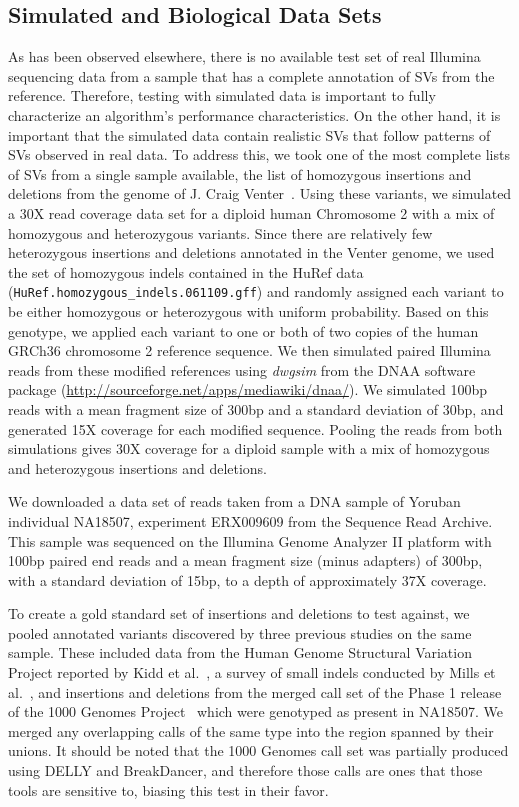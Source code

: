 \documentclass[11pt]{article}
\begin{document}
\subsection{Simulated and Biological Data Sets}\label{section_eval_data_sets}

As has been observed elsewhere, there is no available test set of real Illumina sequencing data from a sample that has a complete annotation of SVs from the reference. Therefore, testing with simulated data is important to fully characterize an algorithm's performance characteristics. On the other hand, it is important that the simulated data contain realistic SVs that follow patterns of SVs observed in real data. To address this, we took one of the most complete lists of SVs from a single sample available, the list of homozygous insertions and deletions from the genome of J. Craig Venter~\citep{Levy:2007fb}. Using these variants, we simulated a 30X read coverage data set for a diploid human Chromosome 2 with a mix of homozygous and heterozygous variants.  Since there are relatively few heterozygous insertions and deletions annotated in the Venter genome, we used the set of homozygous indels contained in the HuRef data (\texttt{HuRef.homozygous\_indels.061109.gff}) and randomly assigned each variant to be either homozygous or heterozygous with uniform probability. Based on this genotype, we applied each variant to one or both of two copies of the human GRCh36 chromosome 2 reference sequence. We then simulated paired Illumina reads from these modified references using \emph{dwgsim} from the DNAA software package (\url{http://sourceforge.net/apps/mediawiki/dnaa/}). We simulated 100bp reads with a mean fragment size of 300bp and a standard deviation of 30bp, and generated 15X coverage for each modified sequence. Pooling the reads from both simulations gives 30X coverage for a diploid sample with a mix of homozygous and heterozygous insertions and deletions.

We downloaded a data set of reads taken from a DNA sample of Yoruban individual NA18507, experiment ERX009609 from the Sequence Read Archive. This sample was sequenced on the Illumina Genome Analyzer II platform with 100bp paired end reads and a mean fragment size (minus adapters) of 300bp, with a standard deviation of 15bp, to a depth of approximately 37X coverage.

To create a gold standard set of insertions and deletions to test against, we pooled annotated variants discovered by three previous studies on the same sample. These included data from the Human Genome Structural Variation Project reported by Kidd et al.~\citep{Kidd:2008p926}, a survey of small indels conducted by Mills et al.~\citep{Mills:2011fi}, and insertions and deletions from the merged call set of the Phase 1 release of the 1000 Genomes Project~\citep{GenomesProjectConsortium:2012co} which were genotyped as present in NA18507. We merged any overlapping calls of the same type into the region spanned by their unions. It should be noted that the 1000 Genomes call set was partially produced using DELLY and BreakDancer, and therefore those calls are ones that those tools are sensitive to, biasing this test in their favor.
\end{document}

